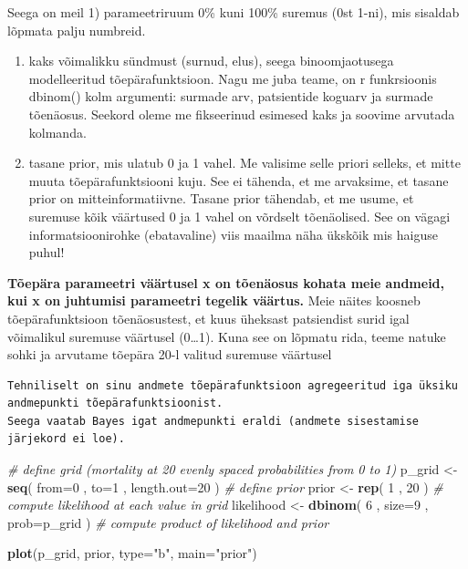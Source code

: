 \documentclass[]{book}
\newenvironment{Shaded}{\begin{snugshade}}{\end{snugshade}}
\newcommand{\KeywordTok}[1]{\textcolor[rgb]{0.13,0.29,0.53}{\textbf{#1}}}
\newcommand{\DataTypeTok}[1]{\textcolor[rgb]{0.13,0.29,0.53}{#1}}
\newcommand{\DecValTok}[1]{\textcolor[rgb]{0.00,0.00,0.81}{#1}}
\newcommand{\StringTok}[1]{\textcolor[rgb]{0.31,0.60,0.02}{#1}}
\newcommand{\CommentTok}[1]{\textcolor[rgb]{0.56,0.35,0.01}{\textit{#1}}}
\newcommand{\NormalTok}[1]{#1}
\begin{document}
Seega on meil 1) parameetriruum 0\% kuni 100\% suremus (0st 1-ni), mis
sisaldab lõpmata palju numbreid.

\begin{enumerate}
\def\labelenumi{\arabic{enumi})}
\setcounter{enumi}{1}
\item
  kaks võimalikku sündmust (surnud, elus), seega binoomjaotusega
  modelleeritud tõepärafunktsioon. Nagu me juba teame, on r funkrsioonis
  dbinom() kolm argumenti: surmade arv, patsientide koguarv ja surmade
  tõenäosus. Seekord oleme me fikseerinud esimesed kaks ja soovime
  arvutada kolmanda.
\item
  tasane prior, mis ulatub 0 ja 1 vahel. Me valisime selle priori
  selleks, et mitte muuta tõepärafunktsiooni kuju. See ei tähenda, et me
  arvaksime, et tasane prior on mitteinformatiivne. Tasane prior
  tähendab, et me usume, et suremuse kõik väärtused 0 ja 1 vahel on
  võrdselt tõenäolised. See on vägagi informatsioonirohke (ebatavaline)
  viis maailma näha ükskõik mis haiguse puhul!
\end{enumerate}

\textbf{Tõepära parameetri väärtusel x on tõenäosus kohata meie andmeid,
kui x on juhtumisi parameetri tegelik väärtus.} Meie näites koosneb
tõepärafunktsioon tõenäosustest, et kuus üheksast patsiendist surid igal
võimalikul suremuse väärtusel (0\ldots{}1). Kuna see on lõpmatu rida,
teeme natuke sohki ja arvutame tõepära 20-l valitud suremuse väärtusel

\begin{verbatim}
Tehniliselt on sinu andmete tõepärafunktsioon agregeeritud iga üksiku andmepunkti tõepärafunktsioonist. 
Seega vaatab Bayes igat andmepunkti eraldi (andmete sisestamise järjekord ei loe).
\end{verbatim}

\begin{Shaded}
\begin{Highlighting}[]
\CommentTok{# define grid (mortality at 20 evenly spaced probabilities from 0 to 1)}
\NormalTok{p_grid <-}\StringTok{ }\KeywordTok{seq}\NormalTok{( }\DataTypeTok{from=}\DecValTok{0}\NormalTok{ , }\DataTypeTok{to=}\DecValTok{1}\NormalTok{ , }\DataTypeTok{length.out=}\DecValTok{20}\NormalTok{ )}
\CommentTok{# define prior}
\NormalTok{prior <-}\StringTok{ }\KeywordTok{rep}\NormalTok{( }\DecValTok{1}\NormalTok{ , }\DecValTok{20}\NormalTok{ )}
\CommentTok{# compute likelihood at each value in grid}
\NormalTok{likelihood <-}\StringTok{ }\KeywordTok{dbinom}\NormalTok{( }\DecValTok{6}\NormalTok{ , }\DataTypeTok{size=}\DecValTok{9}\NormalTok{ , }\DataTypeTok{prob=}\NormalTok{p_grid )}
\CommentTok{# compute product of likelihood and prior}

\KeywordTok{plot}\NormalTok{(p_grid, prior, }\DataTypeTok{type=}\StringTok{"b"}\NormalTok{, }\DataTypeTok{main=}\StringTok{"prior"}\NormalTok{)}
\end{Highlighting}
\end{Shaded}
\end{document}
